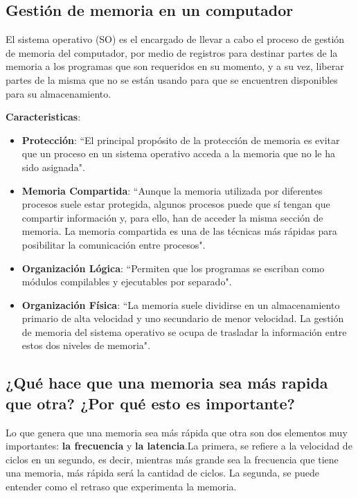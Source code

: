 \documentclass{article}
\begin{document}
\subsection{Gestión de memoria en un computador}
El sistema operativo (SO) es el encargado de llevar a cabo el proceso de gestión de memoria del computador, por medio de registros para destinar partes de la memoria a los programas que son requeridos en su momento, y a su vez, liberar partes de la misma que no se están usando para que se encuentren disponibles para su almacenamiento.
\vspace{0.2cm}

\textbf{Caracteristicas}:

\begin{itemize}
\item\textbf{Protección}: ``El principal propósito de la protección de memoria es evitar que un proceso en un sistema operativo acceda a la memoria que no le ha sido asignada"\cite[Unidad 3. Procesos de memoria y almacenamiento]{Sites.Google}.
\item\textbf{Memoria Compartida}:  ``Aunque la memoria utilizada por diferentes procesos suele estar protegida, algunos procesos puede que sí tengan que compartir información y, para ello, han de acceder la misma sección de memoria. La memoria compartida es una de las técnicas más rápidas para posibilitar la comunicación entre procesos"\cite[Unidad 3. Procesos de memoria y almacenamiento]{Sites.Google}.
\item\textbf{Organización Lógica}:  ``Permiten que los programas se escriban como módulos compilables y ejecutables por separado"\cite[Unidad 3. Procesos de memoria y almacenamiento]{Sites.Google}.
\item\textbf{Organización Física}:  ``La memoria suele dividirse en un almacenamiento primario de alta velocidad y uno secundario de menor velocidad.  La gestión de memoria del sistema operativo se ocupa de trasladar la información entre estos dos niveles de memoria"\cite[Unidad 3. Procesos de memoria y almacenamiento]{Sites.Google}.
\end{itemize}
\newpage
\subsection{¿Qué hace que una memoria sea más rapida que otra?
\centering¿Por qué esto es importante?}
Lo que genera que una memoria sea más rápida que otra son dos elementos muy importantes: \textbf{la frecuencia} y \textbf{la latencia}.La primera, se refiere a la velocidad de ciclos en un segundo, es decir, mientras más grande sea la frecuencia que tiene una memoria, más rápida será la cantidad de ciclos. La segunda, se puede entender como el retraso que experimenta la memoria.
\vspace{0.2cm}
\end{document}
